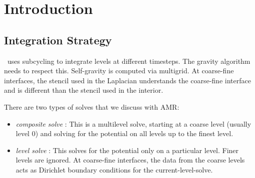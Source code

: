\label{ch:gravity}

\section{Introduction}

\subsection{Integration Strategy}

\castro\ uses subcycling to integrate levels at different timesteps.
The gravity algorithm needs to respect this.  Self-gravity is computed
via multigrid.  At coarse-fine interfaces, the stencil used in the
Laplacian understands the coarse-fine interface and is different than
the stencil used in the interior.

There are two types of
solves that we discuss with AMR:
\begin{itemize}
\item {\em composite solve} : This is a multilevel solve, starting at
  a coarse level (usually level 0) and solving for the potential on
  all levels up to the finest level.

\item {\em level solve} : This solves for the potential only on
 a particular level.  Finer levels are ignored.  At coarse-fine
 interfaces, the data from the coarse levels acts as Dirichlet 
 boundary conditions for the current-level-solve.
\end{itemize}

